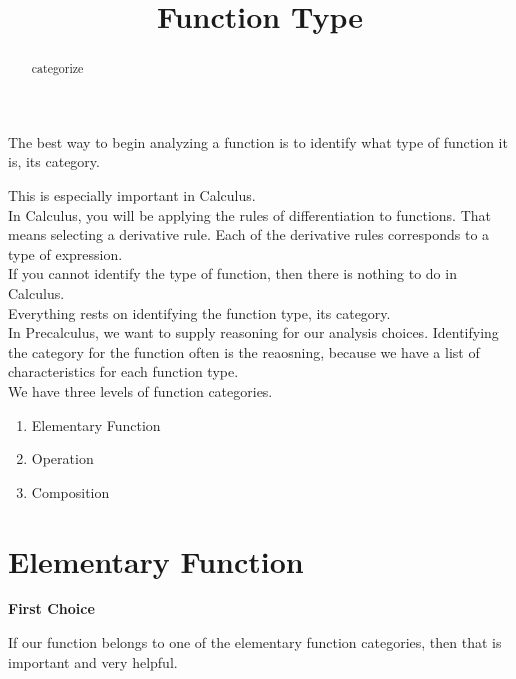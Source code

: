 \documentclass{ximera}
\title{Function Type}
\begin{document}
\begin{abstract}
categorize
\end{abstract}
\maketitle








The best way to begin analyzing a function is to identify what type of function it is, its category.

This is especially important in Calculus.   \\


In Calculus, you will be applying the rules of differentiation to functions. That means selecting a derivative rule.  Each of the derivative rules corresponds to a type of expression. \\

If you cannot identify the type of function, then there is nothing to do in Calculus. \\

Everything rests on identifying the function type, its category. \\



In Precalculus, we want to supply reasoning for our analysis choices.  Identifying the category for the function often is the reaosning, because we have a list of characteristics for each function type. \\



We have three levels of function categories.

\begin{enumerate}
    \item Elementary Function
    \item Operation
    \item Composition
\end{enumerate} 



\section{Elementary Function}

\textbf{\textcolor{purple!85!blue}{First Choice}} 


If our function belongs to one of the elementary function categories, then that is important and very helpful. \\
\end{document}
